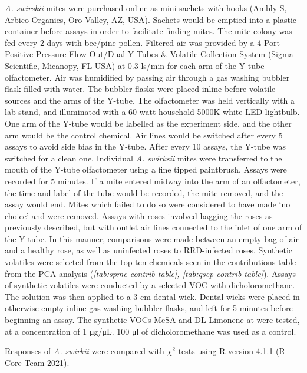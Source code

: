 \documentclass[12pt,final,CPage]{ufthesis}
\begin{document}
{  \emph{A. swirskii} mites were purchased online as mini sachets with hooks (Ambly-S, Arbico Organics, Oro Valley, AZ, USA). Sachets would be emptied into a plastic container before assays in order to facilitate finding mites. The mite colony was fed every 2 days with bee/pine pollen. Filtered air was provided by a 4-Port Positive Pressure Flow Out/Dual Y-Tubes \& Volatile Collection System (Sigma Scientific, Micanopy, FL USA) at 0.3 \si{\litre}s/min for each arm of the Y-tube olfactometer. Air was humidified by passing air through a gas washing bubbler flask filled with water. The bubbler flasks were placed inline before volatile sources and the arms of the Y-tube. The olfactometer was held vertically with a lab stand, and illuminated with a 60 watt household 5000K white LED lightbulb. One arm of the Y-tube would be labelled as the experiment side, and the other arm would be the control chemical. Air lines would be switched after every 5 assays to avoid side bias in the Y-tube. After every 10 assays, the Y-tube was switched for a clean one. Individual \emph{A. swirksii} mites were transferred to the mouth of the Y-tube olfactometer using a fine tipped paintbrush. Assays were recorded for 5 minutes. If a mite entered midway into the arm of an olfactometer, the time and label of the tube would be recorded, the mite removed, and the assay would end. Mites which failed to do so were considered to have made `no choice' and were removed. Assays with roses involved bagging the roses as previously described, but with outlet air lines connected to the inlet of one arm of the Y-tube. In this manner, comparisons were made between an empty bag of air and a healthy rose, as well as uninfected roses to RRD-infected roses. Synthetic volatiles were selected from the top ten chemicals seen in the contributions table from the PCA analysis (\emph{\ref{tab:spme-contrib-table}, \ref{tab:qsep-contrib-table}}). Assays of synthetic volatiles were conducted by a selected VOC with dicholoromethane. The solution was then applied to a 3 \si{\centi\metre} dental wick. Dental wicks were placed in otherwise empty inline gas washing bubbler flasks, and left for 5 minutes before beginning an assay. The synthetic VOCs MeSA and DL-Limonene at were tested, at a concentration of 1 \si{\micro\gram}/\si{\micro\liter}. 100 \si{\micro\litre} of dicholoromethane was used as a control.

  Responses of \emph{A. swirkii} were compared with \(\chi^2\) tests using R version 4.1.1 (R Core Team 2021).

  \hypertarget{results-vocs-olfact}{%
}}
\end{document}
